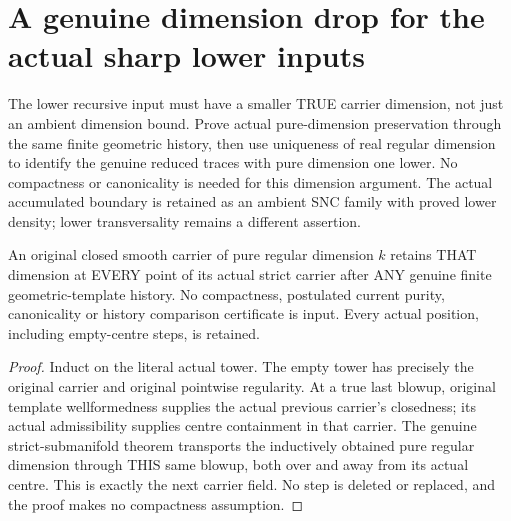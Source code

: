 \section{A genuine dimension drop for the actual sharp lower inputs}

The lower recursive input must have a smaller TRUE carrier dimension,
not just an ambient dimension bound. Prove actual pure-dimension
preservation through the same finite geometric history, then use uniqueness
of real regular dimension to identify the genuine reduced traces with
pure dimension one lower. No compactness or canonicality is needed for
this dimension argument. The actual accumulated boundary is retained as
an ambient SNC family with proved lower density; lower transversality
remains a different assertion.

\begin{theorem}
\label{hir:sharp-actual-template-history-pure-regular-dimension}
\leanok
An original closed smooth carrier of pure regular dimension $k$ retains
THAT dimension at EVERY point of its actual strict carrier after ANY
genuine finite geometric-template history. No compactness, postulated
current purity, canonicality or history comparison certificate is input.
Every actual position, including empty-centre steps, is retained.
\end{theorem}
\begin{proof}
Induct on the literal actual tower. The empty tower has precisely the
original carrier and original pointwise regularity. At a true last
blowup, original template wellformedness supplies the actual previous
carrier's closedness; its actual admissibility supplies centre containment
in that carrier. The genuine strict-submanifold theorem transports the
inductively obtained pure regular dimension through THIS same blowup,
both over and away from its actual centre. This is exactly the next
carrier field. No step is deleted or replaced, and the proof makes no
compactness assumption.
\end{proof}

